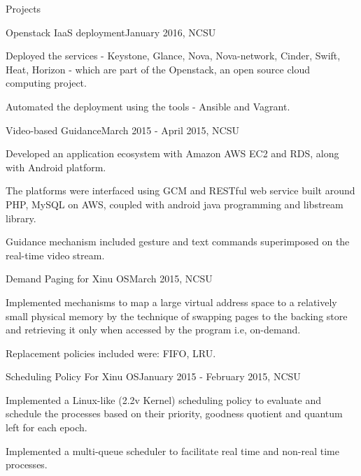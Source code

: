 \documentclass{resume} %
\begin{document}
\begin{rSection}{Projects}
    
    \begin{rSubsectionProject}{Openstack IaaS deployment}{January 2016, NCSU}
    	\item Deployed the services - Keystone, Glance, Nova, Nova-network, Cinder, Swift, Heat, Horizon - which are part of the Openstack, an open source cloud computing project.
        \item Automated the deployment using the tools - Ansible and Vagrant.
    \end{rSubsectionProject}
    
    \begin{rSubsectionProject}{Video-based Guidance}{March 2015 - April 2015, NCSU}
    	\item Developed an application ecosystem with Amazon AWS EC2 and RDS, along with Android platform.
        \item The platforms were interfaced using GCM and RESTful web service built around PHP, MySQL on AWS, coupled with android java programming and libstream library.
       \item Guidance mechanism included gesture and text commands superimposed on the real-time video stream.
    \end{rSubsectionProject}
    
    \begin{rSubsectionProject}{Demand Paging for Xinu OS}{March 2015, NCSU}
    	\item Implemented mechanisms to map a large virtual address space to a relatively small physical memory by the technique of swapping pages to the backing store and retrieving it only when accessed by the program i.e, on-demand.
    	\item Replacement policies included were: FIFO, LRU.
    \end{rSubsectionProject}
    
    \begin{rSubsectionProject}{Scheduling Policy For Xinu OS}{January 2015 - February 2015, NCSU}
    	\item Implemented a Linux-like (2.2v Kernel) scheduling policy to evaluate and schedule the processes  based on their priority, goodness quotient and quantum left for each epoch.
        \item Implemented a multi-queue scheduler to facilitate real time and non-real time processes. 
    \end{rSubsectionProject}
    

\end{rSection}
\end{document}
